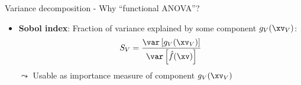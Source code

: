 \documentclass[10pt,compress,t,notes=noshow, xcolor=table]{beamer}
\newcommand{\open}{}
\newcommand{\close}{}
\newcommand{\predvar}{Var\left[\hat{f}(\xv)\right]}
\begin{document}
\begin{framev}[align=top]{Variance decomposition - Why ``functional ANOVA''?
}
\begin{itemize}[<+->]
\begin{align*}
1 &= \frac{\var\left[g_{\open \emptyset \close}\right]}{\predvar} + \frac{\var\left[g_{\open 1 \close}(x_1)\right]}{\predvar} + %
\;\dots\;
\frac{\var\left[g_{\open 1, 2 \close}(x_1, x_2)\right]}{\predvar} \;\dots\; + \frac{\var\left[g_{\open 1,\ldots,p \close}(\xv)\right]}{\predvar}
\end{align*}
\item[$\rightarrow$] \textbf{Sobol index}: Fraction of variance explained by some component $g_{\open V \close}(\xv_V)$:
$$
S_V = \frac{\var\left[g_{\open V \close}(\xv_V)\right]}{\var\left[\hat{f}(\xv)\right]}
$$
$\leadsto$ Usable as importance measure of component $g_{\open V \close}(\xv_V)$\\
\end{itemize}
\end{framev}



\endlecture
\end{document}
